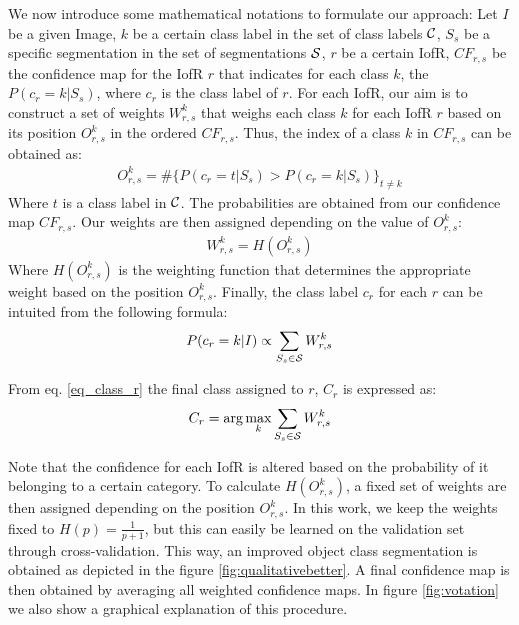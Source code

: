 \documentclass[10pt,twocolumn,letterpaper]{article}
\begin{document}
We now introduce some mathematical notations to formulate our approach:
Let $I$ be a given Image,
$k$ be a certain class label in the set of class labels $\cal{C}$,
$S_s$ be a specific segmentation in the set of segmentations $\cal{S}$,
$r$ be a certain IofR,
$CF_{r,s}$ be the confidence map for the IofR $r$ that indicates for each class $k$, the $P(c_r=k|S_s)$, where $c_r$ is the class label of $r$.
For each IofR, our aim is to construct a set of weights $W_{r,s}^k$ that weighs each class $k$ for each IofR $r$ based on its position $O_{r,s}^k$ in the ordered $CF_{r,s}$.
Thus, the index of a class $k$ in $CF_{r,s}$ can be obtained as:
\begin{eqnarray}
O_{r,s}^k = \#\{P(c_r=t|S_s) > P(c_r=k|S_s)\}_{t\neq{k}}
\end{eqnarray}
Where $t$ is a class label in $\cal{C}$. The probabilities are obtained from our confidence map $CF_{r,s}$.
Our weights are then assigned depending on the value of $O_{r,s}^k$:
\begin{eqnarray}
W_{r,s}^k = H(O_{r,s}^k)
\end{eqnarray}
Where $H(O_{r,s}^k)$ is the weighting function that determines the appropriate weight based on the position $O_{r,s}^k$.
Finally, the class label $c_r$ for each $r$ can be intuited from the following formula:
\begin{eqnarray}\label{eq_class_r}
P(c_r=k|I) \propto \sum_{S_s\in\cal{S}}{W_{r,s}^k}
\end{eqnarray}

From eq. \ref{eq_class_r} the final class assigned to $r$, $C_r$ is expressed as:
\begin{eqnarray}
C_r = \arg\max_k  \sum_{S_s\in\cal{S}}{W_{r,s}^k} 
\end{eqnarray}


Note that the confidence for each IofR is altered based on the probability of it belonging to a certain category.
To calculate $H(O_{r,s}^k)$, a fixed set of weights are then assigned depending on the position $O_{r,s}^k$.
In this work, we keep the weights fixed to $H(p)=\frac{1}{p + 1}$, but this can easily be learned on the validation set through cross-validation.
This way, an improved object class segmentation is obtained as depicted in the figure \ref{fig:qualitativebetter}.
A final confidence map is then obtained by averaging all weighted confidence maps.
In figure \ref{fig:votation} we also show a graphical explanation of this procedure.
\end{document}

